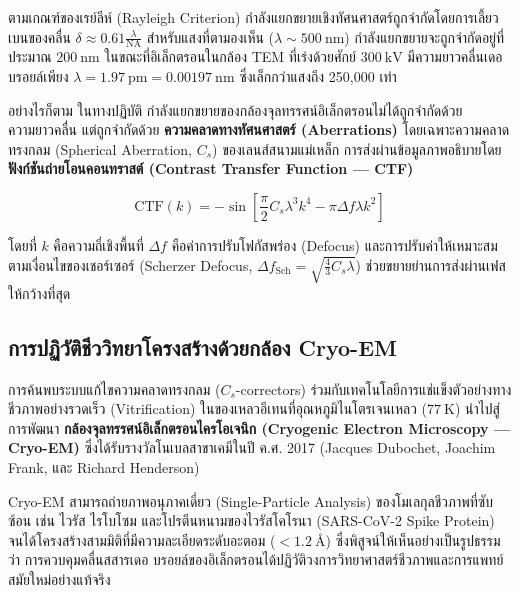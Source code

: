 ตามเกณฑ์ของเรย์ลีห์ (Rayleigh Criterion) กำลังแยกขยายเชิงทัศนศาสตร์ถูกจำกัดโดยการเลี้ยวเบนของคลื่น $\delta \approx 0.61 \frac{\lambda}{\text{NA}}$ สำหรับแสงที่ตามองเห็น ($\lambda \sim 500~\text{nm}$) กำลังแยกขยายจะถูกจำกัดอยู่ที่ประมาณ $200~\text{nm}$ ในขณะที่อิเล็กตรอนในกล้อง TEM ที่เร่งด้วยศักย์ $300~\text{kV}$ มีความยาวคลื่นเดอ บรอยล์เพียง $\lambda = 1.97~\text{pm} = 0.00197~\text{nm}$ ซึ่งเล็กกว่าแสงถึง 250,000 เท่า

อย่างไรก็ตาม ในทางปฏิบัติ กำลังแยกขยายของกล้องจุลทรรศน์อิเล็กตรอนไม่ได้ถูกจำกัดด้วยความยาวคลื่น แต่ถูกจำกัดด้วย \textbf{ความคลาดทางทัศนศาสตร์ (Aberrations)} โดยเฉพาะความคลาดทรงกลม (Spherical Aberration, $C_s$) ของเลนส์สนามแม่เหล็ก การส่งผ่านข้อมูลภาพอธิบายโดย \textbf{ฟังก์ชันถ่ายโอนคอนทราสต์ (Contrast Transfer Function --- CTF)}

\begin{equation}
\text{CTF}(k) = -\sin\left[ \frac{\pi}{2} C_s \lambda^3 k^4 - \pi \Delta f \lambda k^2 \right]
\label{eq:ctf_function}
\end{equation}

โดยที่ $k$ คือความถี่เชิงพื้นที่ $\Delta f$ คือค่าการปรับโฟกัสพร่อง (Defocus) และการปรับค่าให้เหมาะสมตามเงื่อนไขของเชอร์เซอร์ (Scherzer Defocus, $\Delta f_{\text{Sch}} = \sqrt{\frac{4}{3}C_s \lambda}$) ช่วยขยายย่านการส่งผ่านเฟสให้กว้างที่สุด

\subsection{การปฏิวัติชีววิทยาโครงสร้างด้วยกล้อง Cryo-EM}

การค้นพบระบบแก้ไขความคลาดทรงกลม ($C_s$-correctors) ร่วมกับเทคโนโลยีการแช่แข็งตัวอย่างทางชีวภาพอย่างรวดเร็ว (Vitrification) ในของเหลวอีเทนที่อุณหภูมิไนโตรเจนเหลว ($77~\text{K}$) นำไปสู่การพัฒนา \textbf{กล้องจุลทรรศน์อิเล็กตรอนไครโอเจนิก (Cryogenic Electron Microscopy --- Cryo-EM)} ซึ่งได้รับรางวัลโนเบลสาขาเคมีในปี ค.ศ. 2017 (Jacques Dubochet, Joachim Frank, และ Richard Henderson)

Cryo-EM สามารถถ่ายภาพอนุภาคเดี่ยว (Single-Particle Analysis) ของโมเลกุลชีวภาพที่ซับซ้อน เช่น ไวรัส ไรโบโซม และโปรตีนหนามของไวรัสโคโรนา (SARS-CoV-2 Spike Protein) จนได้โครงสร้างสามมิติที่มีความละเอียดระดับอะตอม ($< 1.2~\text{\AA}$) ซึ่งพิสูจน์ให้เห็นอย่างเป็นรูปธรรมว่า การควบคุมคลื่นสสารเดอ บรอยล์ของอิเล็กตรอนได้ปฏิวัติวงการวิทยาศาสตร์ชีวภาพและการแพทย์สมัยใหม่อย่างแท้จริง

